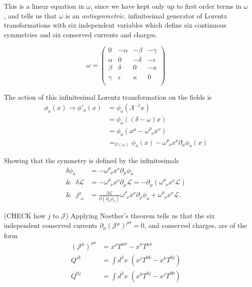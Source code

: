 \noindent This is a linear equation in $\omega$, since we have kept only up to first order terms in $\omega$, and tells us that $\omega$ is an \textit{antisymmetric}, infinitesimal generator of Lorentz transformations with six independent variables which define six continuous symmetries and six conserved currents and charges.

\begin{equation}
\omega = \left(
\begin{array}{cccc}
0 & -\alpha & -\beta & -\gamma \\
\alpha & 0 & -\delta & -\epsilon \\
\beta & \delta & 0 & -\kappa \\
\gamma & \epsilon & \kappa & 0 \\
\end{array}
\right)
\end{equation}

\noindent The action of this infinitesimal Lorentz transformation on the fields is 
\begin{align}
\phi_a(x) \rightarrow \phi'_a(x) &= \phi_a(\Lambda^{-1}x) \\
&= \phi_a((\delta-\omega)x) \\
&= \phi_a(x^\mu - \omega^\mu_{\,\,\,\nu} x^\nu) \\ 
&=_{\mathcal{O}(\omega)} \phi_a(x) - \omega^\mu_{\,\,\,\nu} x^\nu \partial_\mu \phi_a(x)
\end{align}

\noindent Showing that the symmetry is defined by the infinitesimals
\begin{align}
\delta \phi_a &= -\omega^\mu_{\,\,\,\nu} x^\nu \partial_\mu \phi_a \\
\& \,\,\,\, \delta \mathscr{L} &= -\omega^\mu_{\,\,\,\nu} x^\nu \partial_\mu \mathscr{L} = -\partial_\mu(\omega^\mu_{\,\,\,\nu} x^\nu \mathscr{L}) \\
\& \,\,\,\, j^\mu_{\,\,\,\omega} &= \frac{\partial \mathscr{L}}{\partial (\partial_\mu \phi_a)} \omega^\rho_{\,\,\,\nu} x^\nu \partial_\rho \phi_a + \omega^\mu_{\,\,\,\nu} x^\nu \mathscr{L}.
\end{align}

\noindent (CHECK how $j$ to $\mathcal{J}$) Applying Noether's theorem tells us that the six independent conserved currents $\partial_\mu (\mathcal{J}^\mu)^{\rho \sigma} = 0$, and conserved charges, are of the form
\begin{align}
(\mathcal{J}^\mu)^{\rho \sigma} &= x^\rho T^{\mu \sigma} - x^\sigma T^{\mu \rho} \\ 
Q^{jk} &= \int d^3x \,\, (x^j T^{0k} - x^k T^{0j}) \\
Q^{0j} &= \int d^3x \,\, (x^0 T^{0j} - x^j T^{00})
\end{align}

